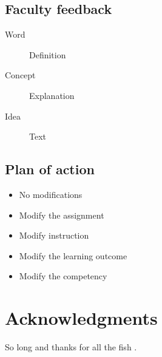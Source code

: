 \documentclass[fleqn,10pt]{SelfArx}\usepackage[]{graphicx}\usepackage[]{color}
\begin{document}
\subsection{Faculty feedback}
\lipsum[1] %

\begin{description}
\item[Word] Definition
\item[Concept] Explanation
\item[Idea] Text
\end{description}

\lipsum[1] %

\subsection{Plan of action}
\lipsum[1] %
\begin{itemize}[noitemsep] %
\item No modifications
\item Modify the assignment
\item Modify instruction
\item Modify the learning outcome
\item Modify the competency
\end{itemize}

\section*{Acknowledgments} %


So long and thanks for all the fish \citep{Knuth1984}.

\printbibliography[title={References},heading=bibintoc]


\end{document}
